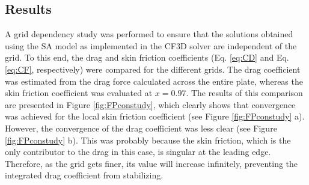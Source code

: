 \subsection{Results}
A grid dependency study was performed to ensure that the solutions obtained using the SA model as implemented in the CF3D solver are independent of the grid. To this end, the drag and skin friction coefficients (Eq. \ref{eq:CD} and Eq. \ref{eq:CF}, respectively) were compared for the different grids. The drag coefficient was estimated from the drag force calculated across the entire plate, whereas the skin friction coefficient was evaluated at $x=0.97$. The results of this comparison are presented in Figure \ref{fig:FPconstudy}, which clearly shows that convergence was achieved for the local skin friction coefficient (see Figure \ref{fig:FPconstudy} a). However, the convergence of the drag coefficient was less clear (see Figure \ref{fig:FPconstudy} b). This was probably because the skin friction, which is the only contributor to the drag in this case, is singular at the leading edge. Therefore, as the grid gets finer, its value will increase infinitely, preventing the integrated drag coefficient from stabilizing. 
%
